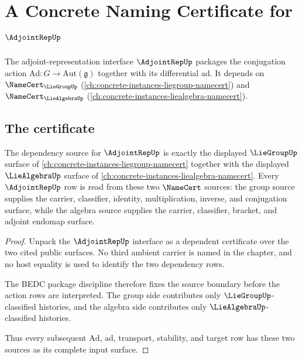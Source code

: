 \chapter{A Concrete Naming Certificate for $\AdjointRepUp$}
\label{ch:concrete-instances-adjointrep-namecert}

The adjoint-representation interface $\AdjointRepUp$ packages the conjugation action $\mathrm{Ad}\colon G \to \mathrm{Aut}(\mathfrak{g})$ together with its differential $\mathrm{ad}$. It depends on $\NameCert_{\LieGroupUp}$ (\autoref{ch:concrete-instances-liegroup-namecert}) and $\NameCert_{\LieAlgebraUp}$ (\autoref{ch:concrete-instances-liealgebra-namecert}).

\section{The certificate}
\label{sec:adjointrep-certificate}

\begin{theorem}
\label{thm:adjointrep-dependency-source-obligation}
The dependency source for $\AdjointRepUp$ is exactly the displayed
$\LieGroupUp$ surface of
\autoref{ch:concrete-instances-liegroup-namecert} together with the displayed
$\LieAlgebraUp$ surface of
\autoref{ch:concrete-instances-liealgebra-namecert}. Every
$\AdjointRepUp$ row is read from these two $\NameCert$ sources: the group
source supplies the carrier, classifier, identity, multiplication, inverse,
and conjugation surface, while the algebra source supplies the carrier,
classifier, bracket, and adjoint endomap surface.
\end{theorem}
\begin{proof}
Unpack the $\AdjointRepUp$ interface as a dependent certificate over the two
cited public surfaces. No third ambient carrier is named in the chapter, and
no host equality is used to identify the two dependency rows.

The BEDC package discipline therefore fixes the source boundary before the
action rows are interpreted. The group side contributes only
$\LieGroupUp$-classified histories, and the algebra side contributes only
$\LieAlgebraUp$-classified histories.

Thus every subsequent $\mathrm{Ad}$, $\mathrm{ad}$, transport, stability, and
target row has these two sources as its complete input surface.
\end{proof}

